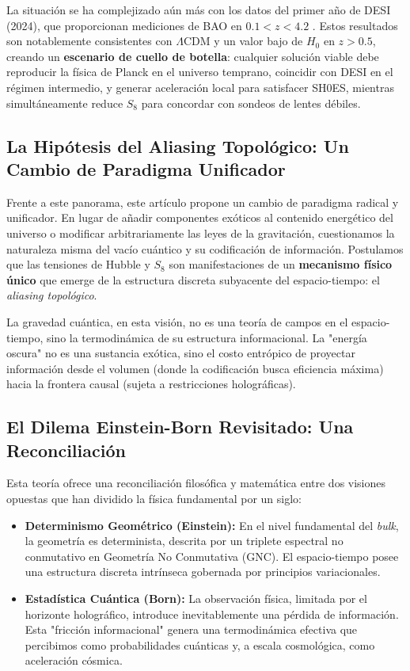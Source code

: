 \documentclass[12pt, a4paper]{article}
\theoremstyle{plain}
\theoremstyle{definition}
\begin{document}
La situación se ha complejizado aún más con los datos del primer año de DESI (2024), 
que proporcionan mediciones de BAO en $0.1 < z < 4.2$ \cite{DESI2024}. Estos 
resultados son notablemente consistentes con $\Lambda$CDM y un valor bajo de $H_0$ 
en $z > 0.5$, creando un \textbf{escenario de cuello de botella}: cualquier 
solución viable debe reproducir la física de Planck en el universo temprano, 
coincidir con DESI en el régimen intermedio, y generar aceleración local para 
satisfacer SH0ES, mientras simultáneamente reduce $S_8$ para concordar con 
sondeos de lentes débiles.

\subsection{La Hipótesis del Aliasing Topológico: Un Cambio de Paradigma Unificador}

Frente a este panorama, este artículo propone un cambio de paradigma radical 
y unificador. En lugar de añadir componentes exóticos al contenido energético 
del universo \cite{DarkEnergyReview} o modificar arbitrariamente las leyes de 
la gravitación, cuestionamos la naturaleza misma del vacío cuántico y su 
codificación de información. Postulamos que las tensiones de Hubble y $S_8$ son 
manifestaciones de un \textbf{mecanismo físico único} que emerge de la estructura 
discreta subyacente del espacio-tiempo: el \textit{aliasing topológico}.

La gravedad cuántica, en esta visión, no es una teoría de campos en el espacio-tiempo, 
sino la termodinámica de su estructura informacional. La "energía oscura" no es 
una sustancia exótica, sino el costo entrópico de proyectar información desde 
el volumen (donde la codificación busca eficiencia máxima) hacia la frontera 
causal (sujeta a restricciones holográficas).

\subsection{El Dilema Einstein-Born Revisitado: Una Reconciliación}

Esta teoría ofrece una reconciliación filosófica y matemática entre dos visiones 
opuestas que han dividido la física fundamental por un siglo:

\begin{itemize}
    \item \textbf{Determinismo Geométrico (Einstein):} En el nivel fundamental 
          del \textit{bulk}, la geometría es determinista, descrita por un triplete 
          espectral no conmutativo en Geometría No Conmutativa (GNC). El espacio-tiempo 
          posee una estructura discreta intrínseca gobernada por principios variacionales.
    
    \item \textbf{Estadística Cuántica (Born):} La observación física, limitada 
          por el horizonte holográfico, introduce inevitablemente una pérdida de 
          información. Esta "fricción informacional" genera una termodinámica 
          efectiva que percibimos como probabilidades cuánticas y, a escala 
          cosmológica, como aceleración cósmica.
\end{itemize}
\end{document}
